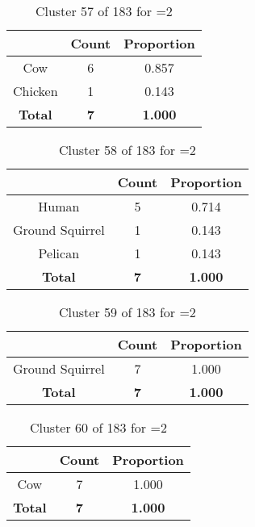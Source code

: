 \begin{table}[ht!]
\centering
\begin{tabular}{|c|c|c|}
\hline
\bf \Spec{} &\bf Count &\bf Proportion\\ \hline \hline
Cow & 6 & 0.857\\ \hline
Chicken & 1 & 0.143\\ \hline
\hline
\bf Total & \bf 7 & \bf 1.000\\ \hline
\end{tabular}
\label{tab:cluster:57:2}
\caption{Cluster 57 of 183 for \minneigh{}=2}
\end{table}

\begin{table}[ht!]
\centering
\begin{tabular}{|c|c|c|}
\hline
\bf \Spec{} &\bf Count &\bf Proportion\\ \hline \hline
Human & 5 & 0.714\\ \hline
Ground Squirrel & 1 & 0.143\\ \hline
Pelican & 1 & 0.143\\ \hline
\hline
\bf Total & \bf 7 & \bf 1.000\\ \hline
\end{tabular}
\label{tab:cluster:58:2}
\caption{Cluster 58 of 183 for \minneigh{}=2}
\end{table}

\begin{table}[ht!]
\centering
\begin{tabular}{|c|c|c|}
\hline
\bf \Spec{} &\bf Count &\bf Proportion\\ \hline \hline
Ground Squirrel & 7 & 1.000\\ \hline
\hline
\bf Total & \bf 7 & \bf 1.000\\ \hline
\end{tabular}
\label{tab:cluster:59:2}
\caption{Cluster 59 of 183 for \minneigh{}=2}
\end{table}

\clearpage
\begin{table}[ht!]
\centering
\begin{tabular}{|c|c|c|}
\hline
\bf \Spec{} &\bf Count &\bf Proportion\\ \hline \hline
Cow & 7 & 1.000\\ \hline
\hline
\bf Total & \bf 7 & \bf 1.000\\ \hline
\end{tabular}
\label{tab:cluster:60:2}
\caption{Cluster 60 of 183 for \minneigh{}=2}
\end{table}

